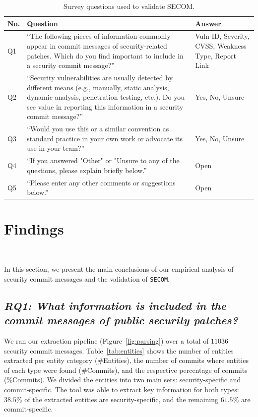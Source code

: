 \begin{table}[!b]
    \footnotesize
    \centering
    \begin{tabular}{ | p{0.25cm} | p{4.5cm} | p{1.75cm} | } 
    \hline
        \textbf{No.} & \textbf{Question} & \textbf{Answer}\\\hline
       Q1 & ``The following pieces of information commonly appear in commit messages of security-related patches.  Which do you find important to include in a security commit message?''  & Vuln-ID, Severity, CVSS, Weakness Type, Report Link\\\hline
        Q2 & ``Security vulnerabilities are usually detected by different means (e.g., manually, static analysis, dynamic analysis, penetration testing, etc.). Do you see value in reporting this information in a security commit message?'' & Yes, No, Unsure\\\hline
        Q3 & ``Would you use this or a similar convention as standard practice in your own work or advocate its use in your team?'' & Yes, No, Unsure\\\hline
        Q4 & ``If you answered "Other" or "Unsure to any of the questions, please explain briefly below.'' & Open \\\hline
        Q5 & ``Please enter any other comments or suggestions below.'' & Open \\
    \hline
    \end{tabular}
    \caption{Survey questions used to validate SECOM.}
    \label{tab:survey}
\end{table}


\section{Findings}~\label{sec:findings}

In this section, we present the main conclusions 
of our empirical analysis of security commit messages 
and the validation of \texttt{SECOM}. 

\subsection*{\textit{RQ1: What information is included in
the commit messages of public security patches?}}


We ran our extraction pipeline (Figure~\ref{fig:parsing}) over a total of $11036$ security commit messages. Table~\ref{tab:entities} shows the number of entities extracted per entity category (\#Entities), the number of commits where entities of each type were found (\#Commits), and the respective percentage of commits (\%Commits). We divided the 
entities into two main sets: security-specific and commit-specific. The tool was able 
to extract key information for both types:
$38.5\%$ of the extracted entities are security-specific, and the remaining $61.5\%$ are commit-specific.

